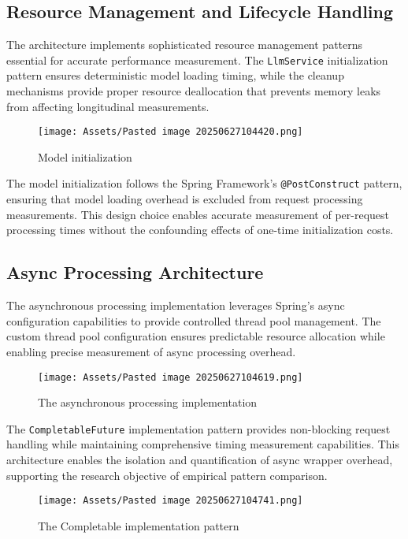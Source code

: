 \subsection{Resource Management and Lifecycle Handling}

The architecture implements sophisticated resource management patterns essential for accurate performance measurement. The \texttt{LlmService} initialization pattern ensures deterministic model loading timing, while the cleanup mechanisms provide proper resource deallocation that prevents memory leaks from affecting longitudinal measurements.

\begin{figure}[H]
    \centering
    \texttt{[image: Assets/Pasted image 20250627104420.png]}
    \caption{Model initialization}
\end{figure}
The model initialization follows the Spring Framework's \texttt{@PostConstruct} pattern, ensuring that model loading overhead is excluded from request processing measurements. This design choice enables accurate measurement of per-request processing times without the confounding effects of one-time initialization costs.

\subsection{Async Processing Architecture}

The asynchronous processing implementation leverages Spring's async configuration capabilities to provide controlled thread pool management. The custom thread pool configuration ensures predictable resource allocation while enabling precise measurement of async processing overhead.

\begin{figure}[H]
    \centering
    \texttt{[image: Assets/Pasted image 20250627104619.png]}
    \caption{The asynchronous processing implementation}
\end{figure}

The \texttt{CompletableFuture} implementation pattern provides non-blocking request handling while maintaining comprehensive timing measurement capabilities. This architecture enables the isolation and quantification of async wrapper overhead, supporting the research objective of empirical pattern comparison.
\begin{figure}[H]
    \centering
    \texttt{[image: Assets/Pasted image 20250627104741.png]}
    \caption{The Completable implementation pattern}
\end{figure}

